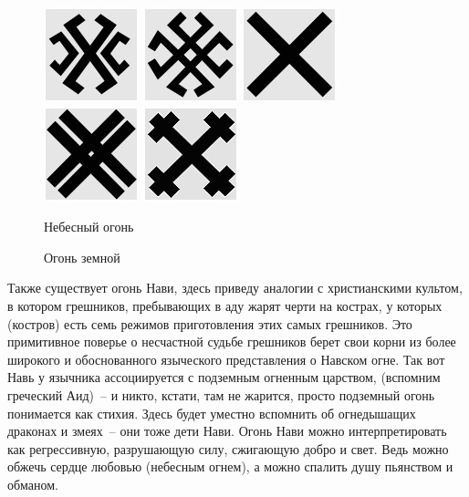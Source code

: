 \documentclass[pscyr,chapters]{hedwork}
\begin{document}
  \begin{figure}[ht]
    \center
    \includegraphics{sl_7_1} \hspace{1em}
    \includegraphics{sl_7_2} \hspace{1em}
    \includegraphics{sl_7_3} \hspace{1em}
    \includegraphics{sl_7_4} \hspace{1em}
    \includegraphics{sl_7_5} \\
    \parbox{12.5em}{\caption{Небесный огонь}\label{pic-sky_fire}} \hspace{1em}
    \parbox{20em}{\caption{Огонь земной}\label{pic-earth_fire}}
  \end{figure}

  Также существует огонь Нави, здесь приведу аналогии с христианскими
  культом, в котором грешников, пребывающих в аду жарят черти на кострах, у
  которых (костров) есть семь режимов приготовления этих самых грешников. Это
  примитивное поверье о несчастной судьбе грешников берет свои
  корни из более широкого и обоснованного языческого представления о Навском
  огне. Так вот Навь у язычника ассоциируется с подземным огненным царством,
  (вспомним греческий Аид)~-- и никто, кстати, там не жарится, просто подземный
  огонь понимается как стихия. Здесь будет уместно вспомнить об огнедышащих
  драконах и змеях~-- они тоже дети Нави. Огонь Нави можно интерпретировать как
  регрессивную, разрушающую силу, сжигающую добро и свет. Ведь можно обжечь
  сердце любовью (небесным огнем), а можно спалить душу пьянством и обманом.
\end{document}
